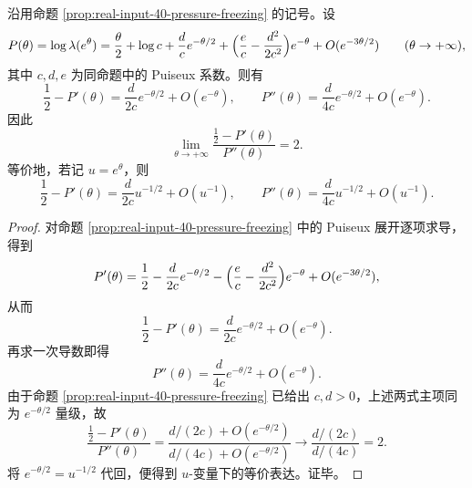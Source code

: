 \begin{theorem}\label{thm:xi-output-potential-zero-temp-square-root-critical-law}
沿用命题 \ref{prop:real-input-40-pressure-freezing} 的记号。设
\[
P(\theta)=\log\lambda(e^\theta)
=\frac{\theta}{2}+\log c+\frac{d}{c}e^{-\theta/2}
+\Bigl(\frac{e}{c}-\frac{d^2}{2c^2}\Bigr)e^{-\theta}
+O(e^{-3\theta/2})
\qquad (\theta\to+\infty),
\]
其中 \(c,d,e\) 为同命题中的 Puiseux 系数。则有
\[
\boxed{\;
\frac12-P'(\theta)=\frac{d}{2c}e^{-\theta/2}+O(e^{-\theta}),
\qquad
P''(\theta)=\frac{d}{4c}e^{-\theta/2}+O(e^{-\theta}).\;}
\]
因此
\[
\boxed{\;
\lim_{\theta\to+\infty}\frac{\frac12-P'(\theta)}{P''(\theta)}=2.\;}
\]
等价地，若记 \(u=e^\theta\)，则
\[
\frac12-P'(\theta)=\frac{d}{2c}u^{-1/2}+O(u^{-1}),
\qquad
P''(\theta)=\frac{d}{4c}u^{-1/2}+O(u^{-1}).
\]
\end{theorem}
\begin{proof}
对命题 \ref{prop:real-input-40-pressure-freezing} 中的 Puiseux 展开逐项求导，得到
\[
P'(\theta)=\frac12-\frac{d}{2c}e^{-\theta/2}
-\Bigl(\frac{e}{c}-\frac{d^2}{2c^2}\Bigr)e^{-\theta}
+O(e^{-3\theta/2}),
\]
从而
\[
\frac12-P'(\theta)=\frac{d}{2c}e^{-\theta/2}+O(e^{-\theta}).
\]
再求一次导数即得
\[
P''(\theta)=\frac{d}{4c}e^{-\theta/2}+O(e^{-\theta}).
\]
由于命题 \ref{prop:real-input-40-pressure-freezing} 已给出 \(c,d>0\)，上述两式主项同为 \(e^{-\theta/2}\) 量级，故
\[
\frac{\frac12-P'(\theta)}{P''(\theta)}
=
\frac{d/(2c)+O(e^{-\theta/2})}{d/(4c)+O(e^{-\theta/2})}
\longrightarrow
\frac{d/(2c)}{d/(4c)}
=2.
\]
将 \(e^{-\theta/2}=u^{-1/2}\) 代回，便得到 \(u\)-变量下的等价表达。证毕。
\end{proof}
